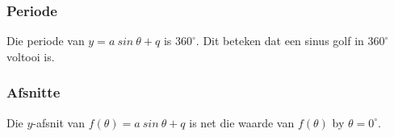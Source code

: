 
\subsubsection*{Periode}
Die periode van $y=a~sin~\theta+q$ is $360^{\circ}$. Dit beteken dat een sinus golf in $360^{\circ}$ voltooi is. 


\subsubsection*{Afsnitte}
\nopagebreak
Die $y$-afsnit van $f(\theta )=a~sin~\theta+q$ is net die waarde van $f(\theta )$ by $\theta =0^{\circ }$.

